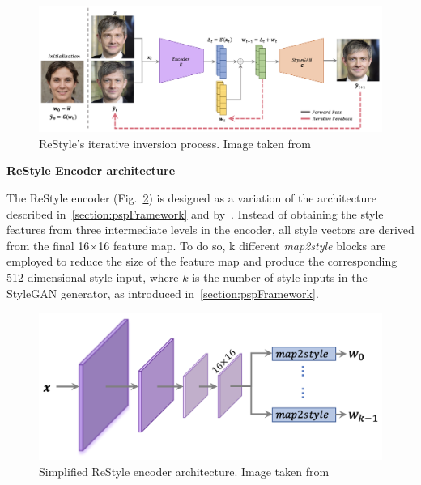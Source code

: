  \begin{figure}[htbp]
\centering
  \includegraphics[scale=0.3]{figures/restyle-inversionScheme.png}
  \caption{ReStyle's iterative inversion process. Image taken from~\cite{alaluf2021restyle}}
  \label{fig:ReStyle inversion scheme}
\end{figure}

\noindent \textbf{ReStyle Encoder architecture}

\noindent The ReStyle encoder (Fig.~\ref{fig:ReStyle encoder architecture}) is designed as a variation of the architecture described in~\ref{section:pspFramework} and by~\cite{e4e}. Instead of obtaining the style features from three intermediate levels in the encoder, all style vectors are derived from the final 16×16 feature map. To do so, k different \textit{map2style} blocks are employed to reduce the size of the feature map and produce the corresponding \num{512}-dimensional style input, where $k$ is the number of style inputs in the StyleGAN generator, as introduced in~\ref{section:pspFramework}.\\
 \begin{figure}[htbp]
\centering
  \includegraphics[scale=0.5]{figures/restyle-encoderArchitecture.png}
  \caption{Simplified ReStyle encoder architecture. Image taken from~\cite{alaluf2021restyle}}
  \label{fig:ReStyle encoder architecture}
\end{figure}


